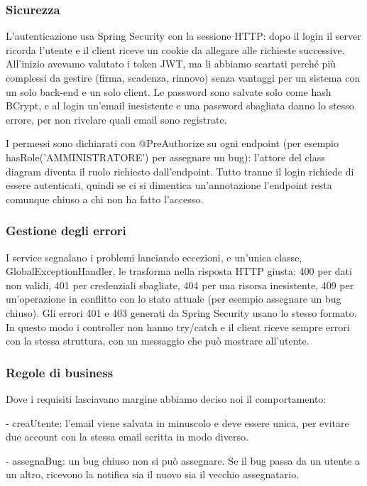 \subsubsection{Sicurezza}
L'autenticazione usa Spring Security con la sessione HTTP: dopo il 
login il server ricorda l'utente e il client riceve un cookie da allegare 
alle richieste successive. All'inizio avevamo valutato i token JWT, ma li 
abbiamo scartati perché più complessi da gestire (firma, scadenza, rinnovo) 
senza vantaggi per un sistema con un solo back-end e un solo client. 
Le password sono salvate solo come hash BCrypt, e al login un'email 
inesistente e una password sbagliata danno lo stesso errore, per non 
rivelare quali email sono registrate. 

I permessi sono dichiarati con @PreAuthorize su ogni endpoint 
(per esempio hasRole('AMMINISTRATORE') per assegnare un bug): l'attore del 
class diagram diventa il ruolo richiesto dall'endpoint. Tutto tranne il login 
richiede di essere autenticati, quindi se ci si dimentica un'annotazione 
l'endpoint resta comunque chiuso a chi non ha fatto l'accesso. 

\subsubsection{Gestione degli errori}
I service segnalano i problemi lanciando eccezioni, e un'unica classe, 
GlobalExceptionHandler, le trasforma nella risposta HTTP giusta: 400 per dati non validi, 
401 per credenziali sbagliate, 404 per una risorsa inesistente, 409 per un'operazione in 
conflitto con lo stato attuale (per esempio assegnare un bug chiuso). Gli errori 401 e 
403 generati da Spring Security usano lo stesso formato. In questo modo i controller 
non hanno try/catch e il client riceve sempre errori con la stessa struttura, con un 
messaggio che può mostrare all'utente. 

\subsubsection{Regole di business}
Dove i requisiti lasciavano margine abbiamo deciso noi il comportamento: 

- creaUtente: l'email viene salvata in minuscolo e deve essere unica, 
per evitare due account con la stessa email scritta in modo diverso. 

- assegnaBug: un bug chiuso non si può assegnare. Se il bug passa 
da un utente a un altro, ricevono la notifica sia il nuovo sia il 
vecchio assegnatario. 

